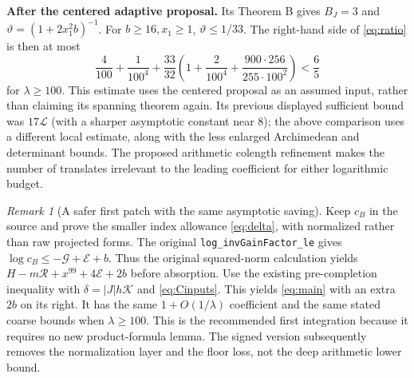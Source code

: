 \documentclass[11pt,letterpaper]{article}
\theoremstyle{remark}\newtheorem{remark}[theorem]{Remark}
\newcommand{\R}{\mathcal R}\newcommand{\E}{\mathcal E}\newcommand{\Lfour}{\mathcal L}\newcommand{\K}{\mathcal K}\newcommand{\G}{\mathcal G}\newcommand{\Gr}{\operatorname{Gram}}\newcommand{\rk}{\operatorname{rank}}\newcommand{\Height}{\operatorname{HeightLe}}
\begin{document}
\textbf{After the centered adaptive proposal.} Its Theorem B gives $B_J=3$ and $\vartheta=(1+2x_1^2b)^{-1}$. For $b\ge16,x_1\ge1$, $\vartheta\le1/33$. The right-hand side of \eqref{eq:ratio} is then at most
\[
 \frac4{100}+\frac1{100^4}+\frac{33}{32}
 \left(1+\frac2{100^4}+\frac{900\cdot256}{255\cdot100^2}\right)<\frac65
\]
for $\lambda\ge100$. This estimate uses the centered proposal as an assumed input, rather than claiming its spanning theorem again. Its previous displayed sufficient bound was $17\Lfour$ (with a sharper asymptotic constant near $8$); the above comparison uses a different local estimate, along with the less enlarged Archimedean and determinant bounds. The proposed arithmetic colength refinement makes the number of translates irrelevant to the leading coefficient for either logarithmic budget.

\begin{remark}[A safer first patch with the same asymptotic saving]
Keep $c_B$ in the source and prove the smaller index allowance \eqref{eq:delta}, with normalized rather than raw projected forms. The original \texttt{log\_invGainFactor\_le} gives $\log c_B\le-\G+\E+b$. Thus the original squared-norm calculation yields $H-m\R+x^{99}+4\E+2b$ before absorption. Use the existing pre-completion inequality with $\delta=|J|h\K$ and \eqref{eq:Cinputs}. This yields \eqref{eq:main} with an extra $2b$ on its right. It has the same $1+O(1/\lambda)$ coefficient and the same stated coarse bounds when $\lambda\ge100$. This is the recommended first integration because it requires no new product-formula lemma. The signed version subsequently removes the normalization layer and the floor loss, not the deep arithmetic lower bound.
\end{remark}
\end{document}
